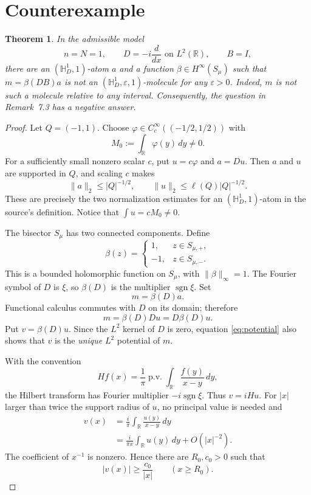 \documentclass[11pt]{article}
\newtheorem{theorem}{Theorem}
\newcommand{\R}{\mathbb R}
\newcommand{\Hinf}{H^\infty}
\begin{document}
\section{Counterexample}

\begin{theorem}\label{thm:main}
In the admissible model
\[
 n=N=1,\qquad D=-i\frac{d}{dx}\text{ on }L^2(\R),\qquad B=I,
\]
there are an $(\mathbb H_D^1,1)$-atom $a$ and a function
$\beta\in\Hinf(S_\mu)$ such that $m=\beta(DB)a$ is not an
$(\mathbb H_D^1,\varepsilon,1)$-molecule for any $\varepsilon>0$.
Indeed, $m$ is not such a molecule relative to any interval.  Consequently,
the question in Remark~7.3 has a negative answer.
\end{theorem}

\begin{proof}
Let $Q=(-1,1)$.  Choose $\varphi\in C_c^\infty((-1/2,1/2))$ with
\[
 M_0:=\int_\R\varphi(y)\,dy\ne0.
\]
For a sufficiently small nonzero scalar $c$, put $u=c\varphi$ and $a=Du$.
Then $a$ and $u$ are supported in $Q$, and scaling $c$ makes
\[
 \|a\|_2\le |Q|^{-1/2},
 \qquad
 \|u\|_2\le \ell(Q)|Q|^{-1/2}.
\]
These are precisely the two normalization estimates for an
$(\mathbb H_D^1,1)$-atom in the source's definition.  Notice that
$\int u=cM_0\ne0$.

The bisector $S_\mu$ has two connected components.  Define
\[
 \beta(z)=
 \begin{cases}
  1,&z\in S_{\mu,+},\\
 -1,&z\in S_{\mu,-}.
 \end{cases}
\]
This is a bounded holomorphic function on $S_\mu$, with
$\|\beta\|_\infty=1$.  The Fourier symbol of $D$ is $\xi$, so
$\beta(D)$ is the multiplier $\operatorname{sgn}\xi$.  Set
\[
 m=\beta(D)a.
\]
Functional calculus commutes with $D$ on its domain; therefore
\begin{equation}\label{eq:potential}
 m=\beta(D)Du=D\beta(D)u.
\end{equation}
Put $v=\beta(D)u$.  Since the $L^2$ kernel of $D$ is zero, equation
\eqref{eq:potential} also shows that $v$ is the \emph{unique} $L^2$ potential
of $m$.

With the convention
\[
 Hf(x)=\frac1\pi\operatorname{p.v.}\int_\R\frac{f(y)}{x-y}\,dy,
\]
the Hilbert transform has Fourier multiplier $-i\operatorname{sgn}\xi$.
Thus $v=iHu$.  For $|x|$ larger than twice the support radius of $u$, no
principal value is needed and
\begin{align}\label{eq:asymptotic}
 v(x)
 &=\frac{i}{\pi}\int_\R\frac{u(y)}{x-y}\,dy\\
 &=\frac{i}{\pi x}\int_\R u(y)\,dy+O(|x|^{-2}).
\end{align}
The coefficient of $x^{-1}$ is nonzero.  Hence there are $R_0,c_0>0$ such
that
\begin{equation}\label{eq:pointlower}
 |v(x)|\ge \frac{c_0}{|x|}\qquad(x\ge R_0).
\end{equation}


\end{proof}
\end{document}
